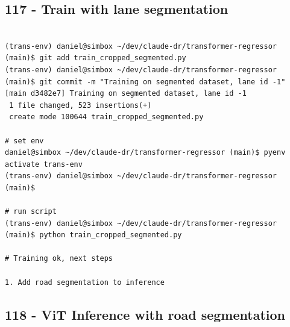 \subsection{117 - Train with lane segmentation}
\label{app_res:117}

\begin{verbatim}

(trans-env) daniel@simbox ~/dev/claude-dr/transformer-regressor (main)$ git add train_cropped_segmented.py 
(trans-env) daniel@simbox ~/dev/claude-dr/transformer-regressor (main)$ git commit -m "Training on segmented dataset, lane id -1"
[main d3482e7] Training on segmented dataset, lane id -1
 1 file changed, 523 insertions(+)
 create mode 100644 train_cropped_segmented.py

# set env
daniel@simbox ~/dev/claude-dr/transformer-regressor (main)$ pyenv activate trans-env
(trans-env) daniel@simbox ~/dev/claude-dr/transformer-regressor (main)$ 

# run script
(trans-env) daniel@simbox ~/dev/claude-dr/transformer-regressor (main)$ python train_cropped_segmented.py

# Training ok, next steps

1. Add road segmentation to inference

\end{verbatim}

\subsection{118 - ViT Inference with road segmentation}
\label{app_res:118}


